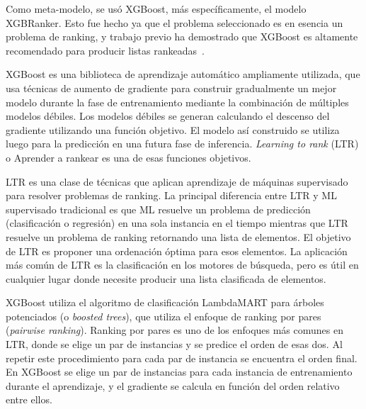 Como meta-modelo, se usó XGBoost, más específicamente, el modelo XGBRanker. Esto fue hecho ya que el problema seleccionado es en esencia un problema de ranking, y trabajo previo ha demostrado que XGBoost es altamente recomendado para producir listas rankeadas~\cite{rankml}.

XGBoost es una biblioteca de aprendizaje automático ampliamente utilizada, que usa técnicas de aumento de gradiente para construir gradualmente un mejor modelo durante la fase de entrenamiento mediante la combinación de múltiples modelos débiles. Los modelos débiles se generan calculando el descenso del gradiente utilizando una función objetivo. El modelo así construido se utiliza luego para la predicción en una futura fase de inferencia. \textit{Learning to rank} (LTR) o Aprender a rankear es una de esas funciones objetivos.

LTR es una clase de técnicas que aplican aprendizaje de máquinas supervisado para resolver problemas de ranking. La principal diferencia entre LTR y ML supervisado tradicional es que ML resuelve un problema de predicción (clasificación o regresión) en una sola instancia en el tiempo mientras que LTR resuelve un problema de ranking retornando una lista de elementos. El objetivo de LTR es proponer una ordenación óptima para esos elementos. La aplicación más común de LTR es la clasificación en los motores de búsqueda, pero es útil en cualquier lugar donde necesite producir una lista clasificada de elementos.

XGBoost utiliza el algoritmo de clasificación LambdaMART \cite{burges2010from} para árboles potenciados (o \textit{boosted trees}), que utiliza el enfoque de ranking por pares (\textit{pairwise ranking}). Ranking por pares es uno de los enfoques más comunes en LTR, donde se elige un par de instancias y se predice el orden de esas dos. Al repetir este procedimiento para cada par de instancia se encuentra el orden final. En XGBoost se elige un par de instancias para cada instancia de entrenamiento durante el aprendizaje, y el gradiente se calcula en función del orden relativo entre ellos.

